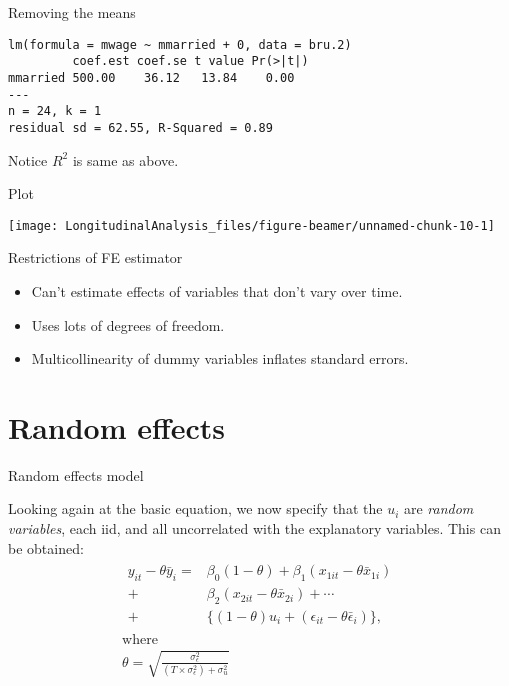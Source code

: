 \documentclass[10pt,ignorenonframetext,]{beamer}
\providecommand{\tightlist}{%
\setlength{\itemsep}{0pt}\setlength{\parskip}{0pt}}
\begin{document}
\begin{frame}[fragile]{Removing the means}

\begin{verbatim}
lm(formula = mwage ~ mmarried + 0, data = bru.2)
         coef.est coef.se t value Pr(>|t|)
mmarried 500.00    36.12   13.84    0.00  
---
n = 24, k = 1
residual sd = 62.55, R-Squared = 0.89
\end{verbatim}

Notice \(R^2\) is same as above.

\end{frame}

\begin{frame}{Plot}

\begin{center}\texttt{[image: LongitudinalAnalysis\_files/figure-beamer/unnamed-chunk-10-1]} \end{center}

\end{frame}

\begin{frame}{Restrictions of FE estimator}

\begin{itemize}
\tightlist
\item
  Can't estimate effects of variables that don't vary over time.
\item
  Uses lots of degrees of freedom.
\item
  Multicollinearity of dummy variables inflates standard errors.
\end{itemize}

\end{frame}

\section{Random effects}\label{random-effects}

\begin{frame}{Random effects model}

Looking again at the basic equation, we now specify that the \(u_i\) are
\emph{random variables}, each iid, and all uncorrelated with the
explanatory variables. This can be obtained: \[
\begin{gathered}
\begin{split}
y_{it} - \theta \bar{y}_i = &\beta_0(1-\theta) + \beta_1 (x_{1it} - \theta \bar{x}_{1i}) \\
    + &\beta_2 (x_{2it} - \theta \bar{x}_{2i}) + \cdots \\
    + &\{(1-\theta) u_i + (\epsilon_{it} - \theta \bar{\epsilon}_i)\} ,
\end{split} \\
\text{where} \\
\theta = \sqrt{\frac{\sigma^2_\epsilon}{(T\times \sigma^2_\epsilon) + \sigma^2_u}}
\end{gathered}
\]

\end{frame}
\end{document}
